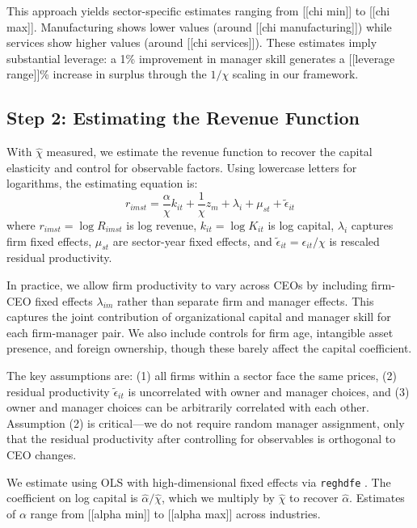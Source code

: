 \documentclass[11pt,a4paper]{article}
\begin{document}
This approach yields sector-specific estimates ranging from [[chi min]] to [[chi max]]. Manufacturing shows lower values (around [[chi manufacturing]]) while services show higher values (around [[chi services]]). These estimates imply substantial leverage: a 1\% improvement in manager skill generates a [[leverage range]]\% increase in surplus through the $1/\chi$ scaling in our framework.

\subsection{Step 2: Estimating the Revenue Function}

With $\hat{\chi}$ measured, we estimate the revenue function to recover the capital elasticity and control for observable factors. Using lowercase letters for logarithms, the estimating equation is:
\begin{equation}
r_{imst} = \frac{\alpha}{\chi} k_{it} + \frac{1}{\chi}z_m + \lambda_i + \mu_{st} + \tilde{\epsilon}_{it}
\end{equation}
where $r_{imst} = \log R_{imst}$ is log revenue, $k_{it} = \log K_{it}$ is log capital, $\lambda_i$ captures firm fixed effects, $\mu_{st}$ are sector-year fixed effects, and $\tilde{\epsilon}_{it} = \epsilon_{it}/\chi$ is rescaled residual productivity.

In practice, we allow firm productivity to vary across CEOs by including firm-CEO fixed effects $\lambda_{im}$ rather than separate firm and manager effects. This captures the joint contribution of organizational capital and manager skill for each firm-manager pair. We also include controls for firm age, intangible asset presence, and foreign ownership, though these barely affect the capital coefficient.

The key assumptions are: (1) all firms within a sector face the same prices, (2) residual productivity $\tilde{\epsilon}_{it}$ is uncorrelated with owner and manager choices, and (3) owner and manager choices can be arbitrarily correlated with each other. Assumption (2) is critical—we do not require random manager assignment, only that the residual productivity after controlling for observables is orthogonal to CEO changes.

We estimate using OLS with high-dimensional fixed effects via \texttt{reghdfe} \citep{reghdfe}. The coefficient on log capital is $\hat{\alpha}/\hat{\chi}$, which we multiply by $\hat{\chi}$ to recover $\hat{\alpha}$. Estimates of $\alpha$ range from [[alpha min]] to [[alpha max]] across industries.
\end{document}
